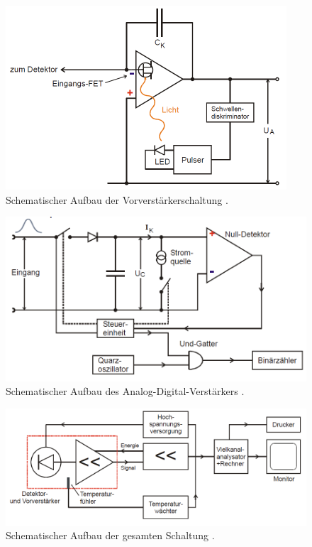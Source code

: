 \begin{figure}
	\centering
	\includegraphics[width=\linewidth-70pt,height=\textheight-70pt,keepaspectratio]{content/images/Schaltung.pdf}
	\caption{Schematischer Aufbau der Vorverstärkerschaltung \cite{V18}.}
	\label{fig:Schalt}
\end{figure}
\begin{figure}
	\centering
	\includegraphics[width=\linewidth-70pt,height=\textheight-70pt,keepaspectratio]{content/images/Schaltung2.pdf}
	\caption{Schematischer Aufbau des Analog-Digital-Verstärkers \cite{V18}.}
	\label{fig:Schalt2}
\end{figure}
\begin{figure}
	\centering
	\includegraphics[width=\linewidth-70pt,height=\textheight-70pt,keepaspectratio]{content/images/Schaltung3.pdf}
	\caption{Schematischer Aufbau der gesamten Schaltung \cite{V18}.}
	\label{fig:Schalt3}
\end{figure}
